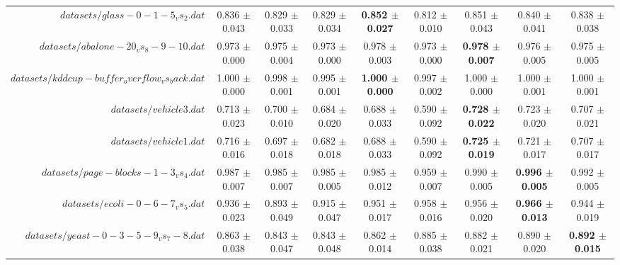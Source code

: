 \begin{table}[!ht]
{\begin{tabular}{r c c c c c c c c}
$datasets/glass-0-1-5_vs_2.dat$ & 0.836 $\pm$ 0.043 & 0.829 $\pm$ 0.033 & 0.829 $\pm$ 0.034 & \textbf{0.852 $\pm$ 0.027} & 0.812 $\pm$ 0.010 & 0.851 $\pm$ 0.043 & 0.840 $\pm$ 0.041 & 0.838 $\pm$ 0.038 \\
$datasets/abalone-20_vs_8-9-10.dat$ & 0.973 $\pm$ 0.000 & 0.975 $\pm$ 0.004 & 0.973 $\pm$ 0.000 & 0.978 $\pm$ 0.003 & 0.973 $\pm$ 0.000 & \textbf{0.978 $\pm$ 0.007} & 0.976 $\pm$ 0.005 & 0.975 $\pm$ 0.005 \\
$datasets/kddcup-buffer_overflow_vs_back.dat$ & 1.000 $\pm$ 0.000 & 0.998 $\pm$ 0.001 & 0.995 $\pm$ 0.001 & \textbf{1.000 $\pm$ 0.000} & 0.997 $\pm$ 0.002 & 1.000 $\pm$ 0.000 & 1.000 $\pm$ 0.001 & 1.000 $\pm$ 0.001 \\
$datasets/vehicle3.dat$ & 0.713 $\pm$ 0.023 & 0.700 $\pm$ 0.010 & 0.684 $\pm$ 0.020 & 0.688 $\pm$ 0.033 & 0.590 $\pm$ 0.092 & \textbf{0.728 $\pm$ 0.022} & 0.723 $\pm$ 0.020 & 0.707 $\pm$ 0.021 \\
$datasets/vehicle1.dat$ & 0.716 $\pm$ 0.016 & 0.697 $\pm$ 0.018 & 0.682 $\pm$ 0.018 & 0.688 $\pm$ 0.033 & 0.590 $\pm$ 0.092 & \textbf{0.725 $\pm$ 0.019} & 0.721 $\pm$ 0.017 & 0.707 $\pm$ 0.017 \\
$datasets/page-blocks-1-3_vs_4.dat$ & 0.987 $\pm$ 0.007 & 0.985 $\pm$ 0.007 & 0.985 $\pm$ 0.005 & 0.985 $\pm$ 0.012 & 0.959 $\pm$ 0.007 & 0.990 $\pm$ 0.005 & \textbf{0.996 $\pm$ 0.005} & 0.992 $\pm$ 0.005 \\
$datasets/ecoli-0-6-7_vs_5.dat$ & 0.936 $\pm$ 0.023 & 0.893 $\pm$ 0.049 & 0.915 $\pm$ 0.047 & 0.951 $\pm$ 0.017 & 0.958 $\pm$ 0.016 & 0.956 $\pm$ 0.020 & \textbf{0.966 $\pm$ 0.013} & 0.944 $\pm$ 0.019 \\
$datasets/yeast-0-3-5-9_vs_7-8.dat$ & 0.863 $\pm$ 0.038 & 0.843 $\pm$ 0.047 & 0.843 $\pm$ 0.048 & 0.862 $\pm$ 0.014 & 0.885 $\pm$ 0.038 & 0.882 $\pm$ 0.021 & 0.890 $\pm$ 0.020 & \textbf{0.892 $\pm$ 0.015} \\
\end{tabular}}
\end{table}
